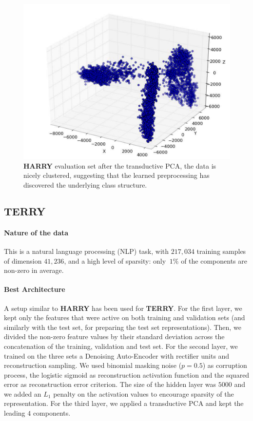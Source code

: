 \begin{figure}[t]
  \begin{center}
    \includegraphics[width=0.75\linewidth]{article1/images/harry_cluster.pdf}
    \caption[Clustering 3D on HARRY]{\label{fig:harry}  {\bf HARRY} evaluation set 
     after the transductive PCA, the data is nicely clustered, suggesting
     that the learned preprocessing has discovered the underlying class structure.}
    \vspace{-0.2in}
  \end{center}
 \vspace*{-1mm}
\end{figure}


\subsection{TERRY}


\paragraph{Nature of the data} This is a natural language processing
(NLP) task, with $217,034$ training samples of dimension $41,236$, and
a high level of sparsity: only $~1\%$ of the components are non-zero in average.


\paragraph{Best Architecture}

A setup similar to {\bf HARRY} has been used for {\bf TERRY}.  For the first layer, we kept
only the features that were active on both training and validation sets (and similarly
with the test set, for preparing the test set representations). Then, we
divided the non-zero feature values by their standard deviation across the
concatenation of the training, validation and test set.  For the
second layer, we trained on the three sets a Denoising Auto-Encoder with rectifier units and
reconstruction sampling.  We used binomial masking noise ($p=0.5$) as
corruption process, the logistic sigmoid as reconstruction activation function
and the squared error as reconstruction error criterion.  The size of the
hidden layer was $5000$ 
and we added an $L_1$ penalty on the activation values to encourage sparsity of
the representation.  For the third layer, we applied a transductive PCA and
kept the leading $4$ components.

